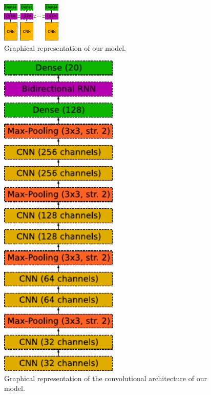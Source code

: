 \documentclass[sigconf]{acmart}
\begin{document}
	\begin{figure}[h!]
		\begin{center}
			\includegraphics[width=0.25\textwidth,height=0.25\textheight,keepaspectratio]{rnn.pdf}
		\end{center}
		\caption{Graphical representation of our model.}
		\label{fig:rnn}
	\end{figure}
	
	\begin{figure}[h!]
		\begin{center}
			\includegraphics[width=0.5\textwidth,height=0.5\textheight,keepaspectratio]{our_model.pdf}
		\end{center}
		\caption{Graphical representation of the convolutional architecture of our model.}
		\label{fig:our_model}
	\end{figure}
\end{document}
